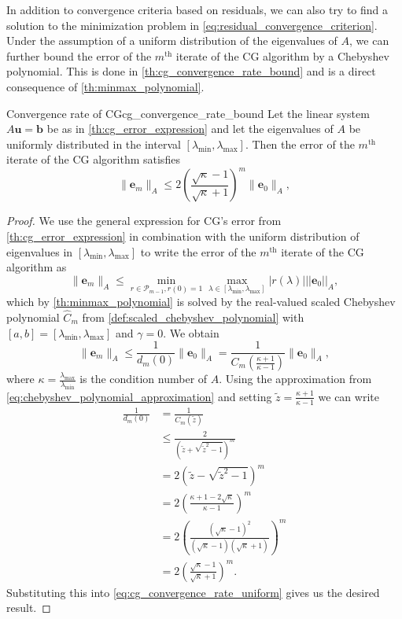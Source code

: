In addition to convergence criteria based on residuals, we can also try to find a solution to the minimization problem in \cref{eq:residual_convergence_criterion}. Under the assumption of a uniform distribution of the eigenvalues of $A$, we can further bound the error of the $m^{\text{th}}$ iterate of the CG algorithm by a Chebyshev polynomial. This is done in \cref{th:cg_convergence_rate_bound} and is a direct consequence of \cref{th:minmax_polynomial}.
\begin{fancyth}{Convergence rate of CG}{cg_convergence_rate_bound}
  Let the linear system $A\mathbf{u} = \mathbf{b}$ be as in \cref{th:cg_error_expression} and let the eigenvalues of $A$ be uniformly distributed in the interval $[\lambda_{\text{min}}, \lambda_{\text{max}}]$. Then the error of the $m^{\text{th}}$ iterate of the CG algorithm satisfies
  \begin{equation}
    \|\mathbf{e}_m\|_A \leq 2\left(\frac{\sqrt{\kappa} - 1}{\sqrt{\kappa} + 1}\right)^{m} \|\mathbf{e}_0\|_A,
    \label{eq:cg_convergence_rate_bound}
  \end{equation}
\end{fancyth}
\begin{proof}
We use the general expression for CG's error from \cref{th:cg_error_expression} in combination with the uniform distribution of eigenvalues in $[\lambda_{\text{min}}, \lambda_{\text{max}}]$ to write the error of the $m^{\text{th}}$ iterate of the CG algorithm as
\begin{equation}
  \|\mathbf{e}_m\|_A \leq \min_{r \in \mathcal{P}_{m-1}, r(0) = 1} \max_{\lambda \in [\lambda_{\text{min}}, \lambda_{\text{max}}]} |r(\lambda)| ||\mathbf{e}_0||_A,
\end{equation}
which by \cref{th:minmax_polynomial} is solved by the real-valued scaled Chebyshev polynomial $\hat{C}_m$ from \cref{def:scaled_chebyshev_polynomial} with $[a,b] = [\lambda_{\text{min}},\lambda_{\text{max}}]$ and $\gamma=0$. We obtain
\begin{equation}
   \|\mathbf{e}_m\|_A \leq \frac{1}{d_m(0)}\|\mathbf{e}_0\|_A =\frac{1}{C_m(\frac{\kappa + 1}{\kappa - 1})}\|\mathbf{e}_0\|_A,
  \label{eq:cg_convergence_rate_uniform}
\end{equation}
where $\kappa = \frac{\lambda_{\text{max}}}{\lambda_{\text{min}}}$ is the condition number of $A$. Using the approximation from \cref{eq:chebyshev_polynomial_approximation} and setting $\tilde{z} = \frac{\kappa + 1}{\kappa -1}$ we can write
\begin{align*}
  \frac{1}{d_m(0)} &= \frac{1}{C_m(\tilde{z})}\\
  &\leq \frac{2}{\left(\tilde{z} + \sqrt{\tilde{z}^2-1}\right)^m}\\
  &=2\left(\tilde{z} - \sqrt{\tilde{z}^2-1}\right)^m\\
  &=2\left(\frac{\kappa + 1 - 2\sqrt{\kappa}}{\kappa - 1}\right)^m\\
  &=2\left(\frac{(\sqrt{\kappa} - 1)^2}{(\sqrt{\kappa} - 1)(\sqrt{\kappa} + 1)}\right)^m\\
  &=2\left(\frac{\sqrt{\kappa} - 1}{\sqrt{\kappa} + 1}\right)^{m}.
\end{align*}
Substituting this into \cref{eq:cg_convergence_rate_uniform} gives us the desired result.
\end{proof}
